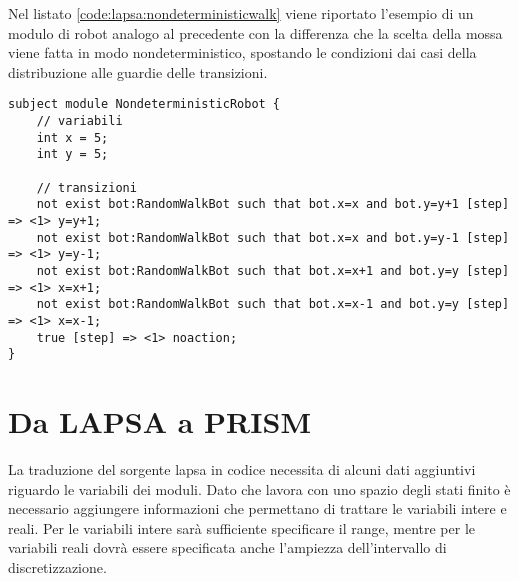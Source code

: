 Nel listato \ref{code:lapsa:nondeterministicwalk} viene riportato l'esempio di un modulo di robot analogo al precedente con la differenza che la scelta della mossa viene fatta in modo nondeterministico, spostando le condizioni dai casi della distribuzione alle guardie delle transizioni.

\begin{lstlisting}[language=lapsa,style=eclipse,caption={Versione nondeterministica della random walk in \ac{lapsa}},label=code:lapsa:nondeterministicwalk]
subject module NondeterministicRobot {
	// variabili
	int x = 5;
	int y = 5;
	
	// transizioni
	not exist bot:RandomWalkBot such that bot.x=x and bot.y=y+1 [step] => <1> y=y+1;
	not exist bot:RandomWalkBot such that bot.x=x and bot.y=y-1 [step] => <1> y=y-1;
	not exist bot:RandomWalkBot such that bot.x=x+1 and bot.y=y [step] => <1> x=x+1;
	not exist bot:RandomWalkBot such that bot.x=x-1 and bot.y=y [step] => <1> x=x-1;
	true [step] => <1> noaction;
}
\end{lstlisting}

\section{Da LAPSA a PRISM}
La traduzione del sorgente \ac{lapsa} in codice \prism{} necessita di alcuni dati aggiuntivi riguardo le variabili dei moduli. Dato che \prism{} lavora con uno spazio degli stati finito è necessario aggiungere informazioni che permettano di trattare le variabili intere e reali. Per le variabili intere sarà sufficiente specificare il range, mentre per le variabili reali dovrà essere specificata anche l'ampiezza dell'intervallo di discretizzazione.

